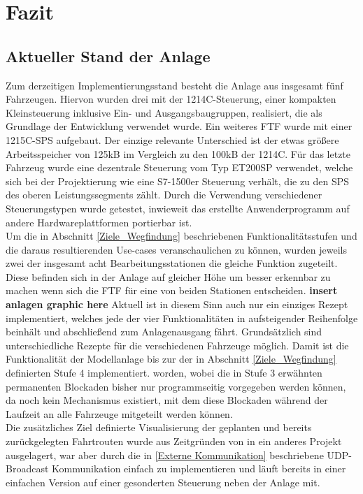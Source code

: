 \chapter{Fazit}

\section{Aktueller Stand der Anlage}
	\label{Stand}
	Zum derzeitigen Implementierungsstand besteht die Anlage aus insgesamt fünf Fahrzeugen. Hiervon wurden drei mit der 1214C-Steuerung, einer kompakten Kleinsteuerung inklusive Ein- und Ausgangsbaugruppen, realisiert, die als Grundlage der Entwicklung verwendet wurde. Ein weiteres \ac{FTF} wurde mit einer 1215C-\ac{SPS} aufgebaut. Der einzige relevante Unterschied ist der etwas größere Arbeitsspeicher von 125kB im Vergleich zu den 100kB der 1214C. Für das letzte Fahrzeug wurde eine dezentrale Steuerung vom Typ ET200SP verwendet, welche sich bei der Projektierung wie eine S7-1500er Steuerung verhält, die zu den \ac{SPS} des oberen Leistungssegments zählt. Durch die Verwendung verschiedener Steuerungstypen wurde getestet, inwieweit das erstellte Anwenderprogramm auf andere Hardwareplattformen portierbar ist. 
	\\
	Um die in Abschnitt \ref{Ziele_Wegfindung} beschriebenen Funktionalitätsstufen und die daraus resultierenden Use-cases veranschaulichen zu können, wurden jeweils zwei der insgesamt acht Bearbeitungsstationen die gleiche Funktion zugeteilt. Diese befinden sich in der Anlage auf gleicher Höhe um besser erkennbar zu machen wenn sich die \ac{FTF} für eine von beiden Stationen entscheiden. \textbf{insert anlagen graphic here} Aktuell ist in diesem Sinn auch nur ein einziges Rezept implementiert, welches jede der vier Funktionalitäten in aufsteigender Reihenfolge beinhält und abschließend zum Anlagenausgang fährt. Grundsätzlich sind unterschiedliche Rezepte für die verschiedenen Fahrzeuge möglich. Damit ist die Funktionalität der Modellanlage bis zur der in Abschnitt \ref{Ziele_Wegfindung} definierten Stufe 4 implementiert. worden, wobei die in Stufe 3 erwähnten permanenten Blockaden bisher nur programmseitig vorgegeben werden können, da noch kein Mechanismus existiert, mit dem diese Blockaden während der Laufzeit an alle Fahrzeuge mitgeteilt werden können.
	\\
	Die zusätzliches Ziel definierte Visualisierung der geplanten und bereits zurückgelegten Fahrtrouten wurde aus Zeitgründen von in ein anderes Projekt ausgelagert, war aber durch die in \ref{Externe Kommunikation} beschriebene \ac{UDP}-Broadcast Kommunikation einfach zu implementieren und läuft bereits in einer einfachen Version auf einer gesonderten Steuerung neben der Anlage mit.
	
